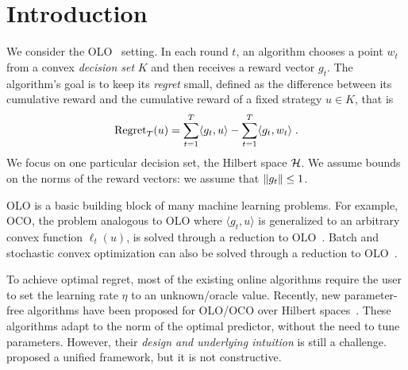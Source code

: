 \section{Introduction}
\label{section:introduction}

We consider the \ac{OLO}~\citep{Cesa-Bianchi-Lugosi-2006, Shalev-Shwartz-2011}
setting. In each round $t$, an algorithm chooses a point $w_t$ from a convex
\emph{decision set} $K$ and then receives a reward vector $g_t$. The algorithm's
goal is to keep its \emph{regret} small, defined as the difference between its
cumulative reward and the cumulative reward of a fixed strategy $u \in K$, that
is
\[
\operatorname{Regret}_T(u) = \sum_{t=1}^T \langle g_t, u \rangle - \sum_{t=1}^T \langle g_t, w_t \rangle \; .
\]
We focus on one particular decision set, the Hilbert space
$\mathcal{H}$. 
We assume bounds on the norms of the reward vectors: we
assume that $\left\|{g_t}\right\| \le 1$.

\ac{OLO} is a basic building block of many machine learning problems. For
example, \ac{OCO}, the problem analogous to \ac{OLO} where $\langle g_t, u
\rangle$ is generalized to an arbitrary convex function $\ell_t(u)$, is solved
through a reduction to \ac{OLO}~\citep{Shalev-Shwartz-2011}.
Batch and stochastic convex optimization
can also be solved through a reduction to \ac{OLO}~\citep{Shalev-Shwartz-2011}.

To achieve optimal regret, most of the existing online algorithms require the user to
set the learning rate $\eta$ to an unknown/oracle value. Recently, new parameter-free
algorithms have been proposed
for \ac{OLO}/\ac{OCO} over Hilbert spaces~\citep{Streeter-McMahan-2012,
Orabona-2013, McMahan-Abernethy-2013, McMahan-Orabona-2014, Orabona-2014}.
These algorithms adapt to the norm of the optimal
predictor, without the need to tune parameters. However, their
\emph{design and underlying intuition} is still a challenge.
\citet{Foster-Rakhlin-Sridharan-2015} proposed a unified framework, but it is not constructive.


